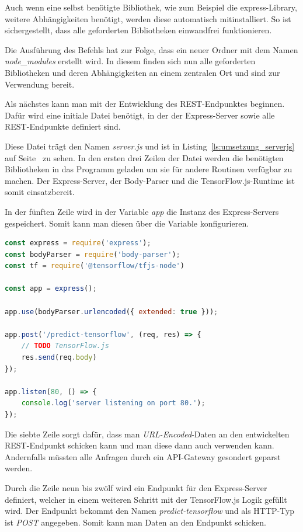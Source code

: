 Auch wenn eine selbst benötigte Bibliothek, wie zum Beispiel die express-Library, weitere Abhängigkeiten benötigt, werden 
diese automatisch mitinstalliert. So ist sichergestellt, dass alle geforderten Bibliotheken einwandfrei funktionieren.

Die Ausführung des Befehls hat zur Folge, dass ein neuer Ordner mit dem Namen \textit{node\_modules} erstellt wird. In
diesem finden sich nun alle geforderten Bibliotheken und deren Abhängigkeiten an einem zentralen Ort und sind zur
Verwendung bereit.

Als nächstes kann man mit der Entwicklung des REST-Endpunktes beginnen. Dafür wird eine initiale Datei benötigt, in der
der Express-Server sowie alle REST-Endpunkte definiert sind.

Diese Datei trägt den Namen \textit{server.js} und ist in Listing~\ref{ls:umsetzung_serverjs} auf 
Seite~\pageref{ls:umsetzung_serverjs} zu sehen. In den ersten drei Zeilen der Datei werden die benötigten Bibliotheken
in das Programm geladen um sie für andere Routinen verfügbar zu machen. Der Express-Server, der Body-Parser und die
TensorFlow.js-Runtime ist somit einsatzbereit.

In der fünften Zeile wird in der Variable \textit{app} die Instanz des Express-Servers gespeichert. Somit kann man
diesen über die Variable konfigurieren.

\begin{lstlisting}[language=JavaScript, caption=Die komplette server.js, label=ls:umsetzung_serverjs]
const express = require('express');
const bodyParser = require('body-parser');
const tf = require('@tensorflow/tfjs-node')

const app = express();

app.use(bodyParser.urlencoded({ extended: true }));

app.post('/predict-tensorflow', (req, res) => {
    // TODO TensorFlow.js
    res.send(req.body)
});

app.listen(80, () => {
    console.log('server listening on port 80.');
});
\end{lstlisting}

Die siebte Zeile sorgt dafür, dass man \textit{URL-Encoded}-Daten an den entwickelten REST-Endpunkt schicken kann und
man diese dann auch verwenden kann. Andernfalls müssten alle Anfragen durch ein API-Gateway gesondert geparst werden.

Durch die Zeile neun bis zwölf wird ein Endpunkt für den Express-Server definiert, welcher in einem weiteren Schritt mit
der TensorFlow.js Logik gefüllt wird. Der Endpunkt bekommt den Namen \textit{predict-tensorflow} und als HTTP-Typ ist
\textit{POST} angegeben. Somit kann man Daten an den Endpunkt schicken.

